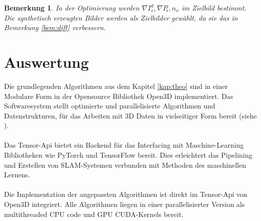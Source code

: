 \documentclass[12pt,DIV=15,BCOR=15mm,twoside,headsepline,abstract=true,listof=totoc,bibliography=totoc]{scrreprt}
\newtheorem{remark}{Bemerkung}[chapter]
\theoremstyle{remark}    %
\begin{document}
    \begin{remark} \label{bem:tsdf_systh_pic_smooth}
    In der Optimierung werden $\nabla I_s^d,\nabla I_s^g, n_x$ im Zielbild bestimmt. Die synthetisch erzeugten Bilder werden als Zielbilder gewählt, 
    da sie das in Bemerkung \ref{bem:diff} verbessern.
    \end{remark}
    \section{Auswertung}
    Die grundlegenden Algorithmen aus dem Kapitel \ref{kap:theo} sind in einer Modulare Form in der Opensource Bibliothek Open3D implementiert. Das Softwaresystem
    stellt optimierte und parallelisierte Algorithmen und Datenstrukturen, für das Arbeiten mit 3D Daten in vielseitiger Form bereit (siehe \cite{Zhou2018}).\\\\
    Das Tensor-Api bietet ein Backend für das Interfacing mit Maschine-Learning Bibliotheken wie PyTorch und TensorFlow bereit. Dies erleichtert das Pipelining und 
    Erstellen von \ac{SLAM}-Systemen verbunden mit Methoden des maschinellen Lernens.\cite{Zhou2018}\\\\
    Die Implementation der angepassten Algorithmen ist direkt im Tensor-Api von Open3D integriert.
    Alle Algorithmen liegen in einer parallelisierter Version als multithreaded CPU code und GPU CUDA-Kernels bereit.
\end{document}
